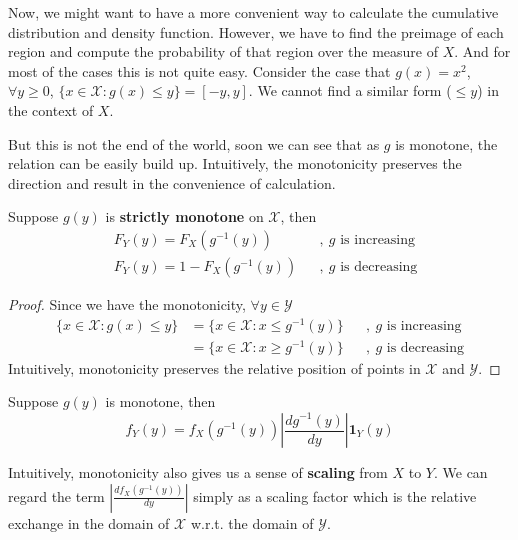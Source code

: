 \documentclass[11pt]{article}
\begin{document}
Now, we might want to have a more convenient way to calculate the cumulative distribution and density function. However, we have to find the preimage of each region and compute the probability of that region over the measure of $X$. And for most of the cases this is not quite easy. Consider the case that $g(x) = x^2$, $\forall y\geq 0$, $\{x\in\mathcal{X}:g(x)\leq y \} = [-y,y]$. We cannot find a similar form ($\leq y$) in the context of $X$.

But this is not the end of the world, soon we can see that as $g$ is monotone, the relation can be easily build up. Intuitively, the monotonicity preserves the direction and result in the convenience of calculation.

\begin{property}
	Suppose $g(y)$ is {\bf strictly monotone} on $\mathcal{X}$, then
	\begin{align*}
	&F_Y(y) = F_X(g^{-1}(y))&&,\ g\mbox{ is increasing}\\
	&F_Y(y) = 1- F_X(g^{-1}(y))&&,\ g\mbox{ is decreasing}
	\end{align*}
\end{property}
\begin{proof}
	Since we have the monotonicity, $\forall y\in\mathcal{Y}$
	\begin{align*}
	\{x\in\mathcal{X}: g(x)\leq y \} &= \{x\in\mathcal{X}: x\leq g^{-1}(y) \}&&,\ g\mbox{ is increasing}\\
	&= \{x\in\mathcal{X}: x\geq g^{-1}(y) \}&&,\ g\mbox{ is decreasing}
	\end{align*}
	Intuitively, monotonicity preserves the relative position of points in $\mathcal{X}$ and $\mathcal{Y}$.
\end{proof}

\begin{property}
	Suppose $g(y)$ is monotone, then
	$$f_Y(y) = f_X(g^{-1}(y)) |\frac{dg^{-1}(y)}{dy}| \mathbf{1}_Y(y)$$
\end{property}
Intuitively, monotonicity also gives us a sense of {\bf scaling} from $X$ to $Y$. We can regard the term $|\frac{df_X(g^{-1}(y))}{dy}|$ simply as a scaling factor which is the relative exchange in the domain of $\mathcal{X}$ w.r.t. the domain  of $\mathcal{Y}$.
\end{document}
